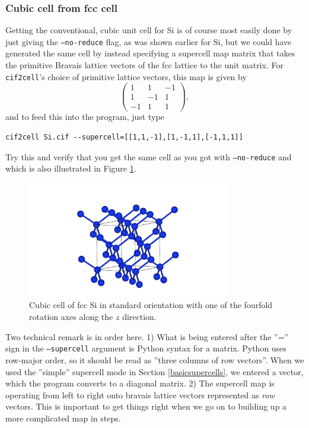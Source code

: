 \documentclass[11pt]{article}
\newcommand{\ciftocell}{\texttt{cif2cell}}
\begin{document}
\subsubsection{Cubic cell from fcc cell}
Getting the conventional, cubic unit cell for Si is of course most easily done by just giving the \texttt{--no-reduce} flag, as was shown earlier for Si, but we could have generated the same cell by instead specifying a supercell map matrix that takes the primitive Bravais lattice vectors of the fcc lattice to the unit matrix. For \ciftocell's choice of primitive lattice vectors, this map is given by
\begin{equation}
\begin{pmatrix}
1 & 1 & -1 \\
1 & -1 & 1 \\
-1 & 1 & 1
\end{pmatrix},
\end{equation}
and to feed this into the program, just type
\begin{verbatim}
cif2cell Si.cif --supercell=[[1,1,-1],[1,-1,1],[-1,1,1]]
\end{verbatim}
Try this and verify that you get the same cell as you got with \texttt{--no-reduce} and which is also illustrated in Figure \ref{cubSi}.

\begin{figure}[htbp] %
   \centering
   \includegraphics[width=0.8\textwidth]{Si_cube.png} 
   \caption{Cubic cell of fcc Si in standard orientation with one of the fourfold rotation axes along the $z$ direction.}
   \label{cubSi}
\end{figure}

Two technical remark is in order here. 1) What is being entered after the ''='' sign in the \texttt{--supercell} argument is Python syntax for a matrix. Python uses row-major order, so it should be read as ''three columns of row vectors''. When we used the ''simple'' supercell mode in Section \ref{basicsupercells}, we entered a vector, which the program converts to a diagonal matrix. 2) The supercell map is operating from left to right onto bravais lattice vectors represented as \emph{row} vectors. This is important to get things right when we go on to building up a more complicated map in steps.
\end{document}
